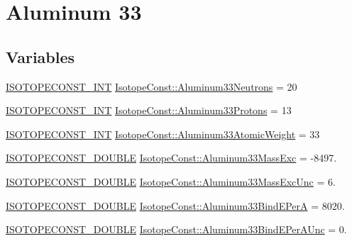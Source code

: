 \hypertarget{group___isotope_const-_aluminum-_al33}{}\section{Aluminum 33}
\label{group___isotope_const-_aluminum-_al33}
\subsection*{Variables}
\begin{DoxyCompactItemize}
\item 
\mbox{\hyperlink{group___isotope_const-_macros_ga5f18360b3e99483a35c32d789e62621c}{I\+S\+O\+T\+O\+P\+E\+C\+O\+N\+S\+T\+\_\+\+I\+NT}} \mbox{\hyperlink{group___isotope_const-_aluminum-_al33_gaaa3d372a588932dacd7e7ab153703a5b}{Isotope\+Const\+::\+Aluminum33\+Neutrons}} = 20
\item 
\mbox{\hyperlink{group___isotope_const-_macros_ga5f18360b3e99483a35c32d789e62621c}{I\+S\+O\+T\+O\+P\+E\+C\+O\+N\+S\+T\+\_\+\+I\+NT}} \mbox{\hyperlink{group___isotope_const-_aluminum-_al33_ga3c6eddbc158b184984a60cad55ab9ebe}{Isotope\+Const\+::\+Aluminum33\+Protons}} = 13
\item 
\mbox{\hyperlink{group___isotope_const-_macros_ga5f18360b3e99483a35c32d789e62621c}{I\+S\+O\+T\+O\+P\+E\+C\+O\+N\+S\+T\+\_\+\+I\+NT}} \mbox{\hyperlink{group___isotope_const-_aluminum-_al33_gaf8645e991fad81edea49b4ae1f45f3d7}{Isotope\+Const\+::\+Aluminum33\+Atomic\+Weight}} = 33
\item 
\mbox{\hyperlink{group___isotope_const-_macros_ga8f45a7272ce02c0b4c65c44636ed719a}{I\+S\+O\+T\+O\+P\+E\+C\+O\+N\+S\+T\+\_\+\+D\+O\+U\+B\+LE}} \mbox{\hyperlink{group___isotope_const-_aluminum-_al33_ga7426f93c42cd6111c84c9695c46270a0}{Isotope\+Const\+::\+Aluminum33\+Mass\+Exc}} = -\/8497.
\item 
\mbox{\hyperlink{group___isotope_const-_macros_ga8f45a7272ce02c0b4c65c44636ed719a}{I\+S\+O\+T\+O\+P\+E\+C\+O\+N\+S\+T\+\_\+\+D\+O\+U\+B\+LE}} \mbox{\hyperlink{group___isotope_const-_aluminum-_al33_gade8cdb1a4a7ffddf8ab4f01ea75598ec}{Isotope\+Const\+::\+Aluminum33\+Mass\+Exc\+Unc}} = 6.
\item 
\mbox{\hyperlink{group___isotope_const-_macros_ga8f45a7272ce02c0b4c65c44636ed719a}{I\+S\+O\+T\+O\+P\+E\+C\+O\+N\+S\+T\+\_\+\+D\+O\+U\+B\+LE}} \mbox{\hyperlink{group___isotope_const-_aluminum-_al33_ga617c8bb79fea5b18e46e5f31e94b6824}{Isotope\+Const\+::\+Aluminum33\+Bind\+E\+PerA}} = 8020.
\item 
\mbox{\hyperlink{group___isotope_const-_macros_ga8f45a7272ce02c0b4c65c44636ed719a}{I\+S\+O\+T\+O\+P\+E\+C\+O\+N\+S\+T\+\_\+\+D\+O\+U\+B\+LE}} \mbox{\hyperlink{group___isotope_const-_aluminum-_al33_ga01b55fd06668b374e7ffaf655a579972}{Isotope\+Const\+::\+Aluminum33\+Bind\+E\+Per\+A\+Unc}} = 0.

\end{DoxyCompactItemize}
